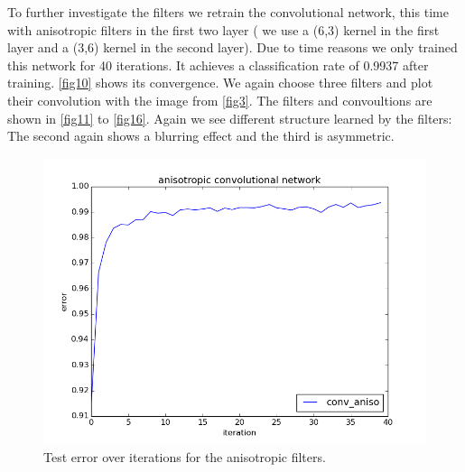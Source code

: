\documentclass{article}
\begin{document}
To further investigate the filters we retrain the convolutional network, this time with anisotropic filters in the first two layer ( we use a (6,3) kernel in the first layer and a (3,6) kernel in the second layer).
Due to time reasons we only trained this network for 40 iterations. It achieves a classification rate of 0.9937 after training.
\autoref{fig10} shows its convergence.
We again choose three filters and plot their convolution with the image from \autoref{fig3}.
The filters and convoultions are shown in \autoref{fig11} to \autoref{fig16}.
Again we see different structure learned by the filters:
\newline 
The second again shows a blurring effect and the third is asymmetric.

\begin{figure}[h]
	\centering
	\includegraphics[width = .8\textwidth]{graphics/conv_aniso.png}
	\caption{Test error over iterations for the anisotropic filters.}
	\label{fig10}
\end{figure}
\end{document}
